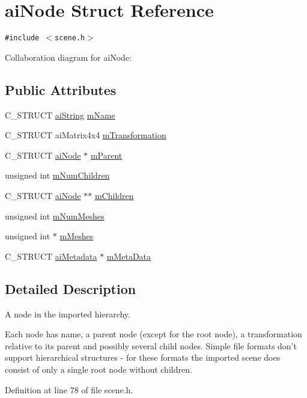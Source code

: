 \hypertarget{structai_node}{
\section{aiNode Struct Reference}
\label{structai_node}
}
{\tt \#include $<$scene.h$>$}

Collaboration diagram for aiNode:\subsection*{Public Attributes}
\begin{CompactItemize}
\item 
C\_\-STRUCT \hyperlink{structai_string}{aiString} \hyperlink{structai_node_fa528a7e43e15d92a920229b1ff094f6}{mName}
\item 
C\_\-STRUCT aiMatrix4x4 \hyperlink{structai_node_adb69c766c7658bba9d2195af16d6831}{mTransformation}
\item 
C\_\-STRUCT \hyperlink{structai_node}{aiNode} $\ast$ \hyperlink{structai_node_a6896b42c78e784db85d822a4c8dd404}{mParent}
\item 
unsigned int \hyperlink{structai_node_f5030494b156ec54632e6182a6e386ca}{mNumChildren}
\item 
C\_\-STRUCT \hyperlink{structai_node}{aiNode} $\ast$$\ast$ \hyperlink{structai_node_c700679f0d4971f124e8444f68057291}{mChildren}
\item 
unsigned int \hyperlink{structai_node_7a411079096f86d1e96b6368d237d897}{mNumMeshes}
\item 
unsigned int $\ast$ \hyperlink{structai_node_cd1706d6508b31916c18e39b7085ca63}{mMeshes}
\item 
C\_\-STRUCT \hyperlink{structai_metadata}{aiMetadata} $\ast$ \hyperlink{structai_node_111b5a6cbc5dccde0cf2a17a6e5c3b67}{mMetaData}
\end{CompactItemize}


\subsection{Detailed Description}
A node in the imported hierarchy.

Each node has name, a parent node (except for the root node), a transformation relative to its parent and possibly several child nodes. Simple file formats don't support hierarchical structures - for these formats the imported scene does consist of only a single root node without children. 

Definition at line 78 of file scene.h.

